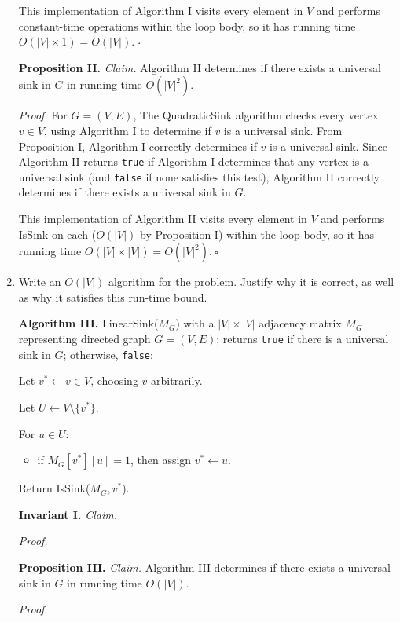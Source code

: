 \begin{enumerate}
\begin{solution}
This implementation of Algorithm I visits every element in $V$ and performs constant-time operations within the loop body, so it has running time $O(|V|\times 1)=O(|V|).~\square$

\textbf{Proposition II. }\textit{Claim. }Algorithm II determines if there exists a universal sink in $G$ in running time $O(|V|^2)$.

\textit{Proof. }For $G=(V,E)$, The {\sc QuadraticSink} algorithm checks every vertex $v\in V$, using Algorithm I to determine if $v$ is a universal sink. From Proposition I, Algorithm I correctly determines if $v$ is a universal sink. Since Algorithm II returns \verb|true| if Algorithm I determines that any vertex is a universal sink (and \verb|false| if none satisfies this test), Algorithm II correctly determines if there exists a universal sink in $G$.

This implementation of Algorithm II visits every element in $V$ and performs {\sc IsSink} on each ($O(|V|)$ by Proposition I) within the loop body, so it has running time $O(|V|\times |V|)=O(|V|^2).~\square$
\end{solution}
\item Write an $O(|V|)$ algorithm for the problem. Justify why it is correct, as well as why it satisfies this run-time bound. 
\begin{solution}
\textbf{Algorithm III. }{\sc LinearSink}($M_G$) with a $|V|\times |V|$ adjacency matrix $M_G$ representing directed graph $G=(V,E)$; returns \verb|true| if there is a universal sink in $G$; otherwise, \verb|false|:

Let $v^*\leftarrow v\in V$, choosing $v$ arbitrarily.

Let $U\leftarrow V\setminus\{v^*\}$.

For $u\in U$:
\begin{itemize}
\item if $M_G[v^*][u]=1$, then assign $v^*\leftarrow u$.
\end{itemize}

Return {\sc IsSink}($M_G,v^*$).

\textbf{Invariant I. }\textit{Claim. }

\textit{Proof. }

\textbf{Proposition III. }\textit{Claim. }Algorithm III determines if there exists a universal sink in $G$ in running time $O(|V|)$.

\textit{Proof. }
\end{solution}
\end{enumerate}
